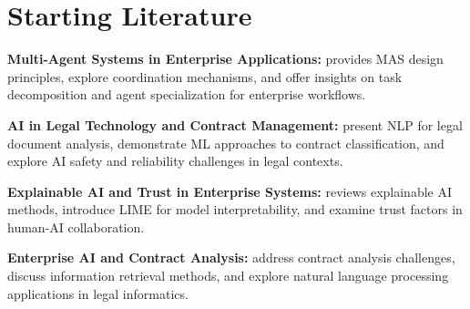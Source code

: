 
\section{Starting Literature}\label{section:starting_literature}

\textbf{Multi-Agent Systems in Enterprise Applications:} \cite{wooldridge2009introduction} provides MAS design principles, \cite{jennings2014roadmap} explore coordination mechanisms, and \cite{stone2000multiagent} offer insights on task decomposition and agent specialization for enterprise workflows.

\textbf{AI in Legal Technology and Contract Management:} \cite{katz2017general} present NLP for legal document analysis, \cite{chalkidis2019neural} demonstrate ML approaches to contract classification, and \cite{hendrycks2021measuring} explore AI safety and reliability challenges in legal contexts.

\textbf{Explainable AI and Trust in Enterprise Systems:} \cite{miller2019explanation} reviews explainable AI methods, \cite{ribeiro2016should} introduce LIME for model interpretability, and \cite{hoffman2018metrics} examine trust factors in human-AI collaboration.

\textbf{Enterprise AI and Contract Analysis:} \cite{kiraz2016semi} address contract analysis challenges, \cite{lease2013crowdsourcing} discuss information retrieval methods, and \cite{savelka2017how} explore natural language processing applications in legal informatics.
